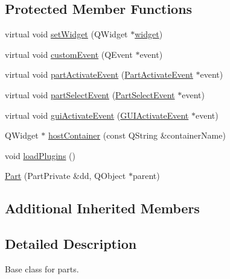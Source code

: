 \subsection*{Protected Member Functions}
\begin{DoxyCompactItemize}
\item 
virtual void \hyperlink{classKParts_1_1Part_a7578836b79ed97019b42f2d2fc03082d}{set\+Widget} (Q\+Widget $\ast$\hyperlink{classKParts_1_1Part_a134900cb0605a1cd5113d90954a01fdf}{widget})
\item 
virtual void \hyperlink{classKParts_1_1Part_a06a8a01b69df2ab366c5c5453b9194bd}{custom\+Event} (Q\+Event $\ast$event)
\item 
virtual void \hyperlink{classKParts_1_1Part_ad848641dbb38a3b2404b2ad554a08fba}{part\+Activate\+Event} (\hyperlink{classKParts_1_1PartActivateEvent}{Part\+Activate\+Event} $\ast$event)
\item 
virtual void \hyperlink{classKParts_1_1Part_a71a55af4b780e14d9ccadddfe7868941}{part\+Select\+Event} (\hyperlink{classKParts_1_1PartSelectEvent}{Part\+Select\+Event} $\ast$event)
\item 
virtual void \hyperlink{classKParts_1_1Part_a34b92f00459085ca7e05b7e8ee321347}{gui\+Activate\+Event} (\hyperlink{classKParts_1_1GUIActivateEvent}{G\+U\+I\+Activate\+Event} $\ast$event)
\item 
Q\+Widget $\ast$ \hyperlink{classKParts_1_1Part_a42ca0149d66ab5f2eea3d22b96300af0}{host\+Container} (const Q\+String \&container\+Name)
\item 
void \hyperlink{classKParts_1_1Part_aff25cf37e0d4e205028d75dee120828c}{load\+Plugins} ()
\item 
\hyperlink{classKParts_1_1Part_aa6c6292dcf062b5f4d711e6ab90070c9}{Part} (Part\+Private \&dd, Q\+Object $\ast$parent)
\end{DoxyCompactItemize}
\subsection*{Additional Inherited Members}


\subsection{Detailed Description}
Base class for parts.

